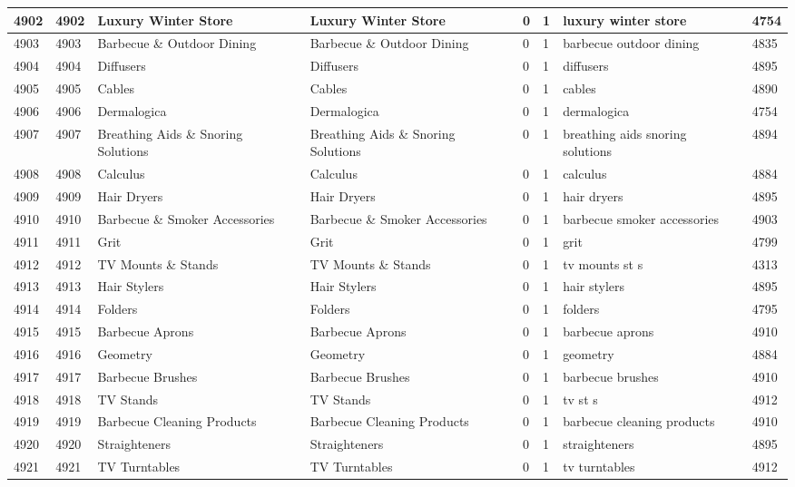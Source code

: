 \begin{longtable}{|l|l|l|l|l|l|l|l|}
4902 & 4902 & Luxury Winter Store & Luxury Winter Store & 0 & 1 & luxury winter store & 4754 \\ \hline 
4903 & 4903 & Barbecue \& Outdoor Dining & Barbecue \& Outdoor Dining & 0 & 1 & barbecue outdoor dining & 4835 \\ \hline 
4904 & 4904 & Diffusers & Diffusers & 0 & 1 & diffusers & 4895 \\ \hline 
4905 & 4905 & Cables & Cables & 0 & 1 & cables & 4890 \\ \hline 
4906 & 4906 & Dermalogica & Dermalogica & 0 & 1 & dermalogica & 4754 \\ \hline 
4907 & 4907 & Breathing Aids \& Snoring Solutions & Breathing Aids \& Snoring Solutions & 0 & 1 & breathing aids snoring solutions & 4894 \\ \hline 
4908 & 4908 & Calculus & Calculus & 0 & 1 & calculus & 4884 \\ \hline 
4909 & 4909 & Hair Dryers & Hair Dryers & 0 & 1 & hair dryers & 4895 \\ \hline 
4910 & 4910 & Barbecue \& Smoker Accessories & Barbecue \& Smoker Accessories & 0 & 1 & barbecue smoker accessories & 4903 \\ \hline 
4911 & 4911 & Grit & Grit & 0 & 1 & grit & 4799 \\ \hline 
4912 & 4912 & TV Mounts \& Stands & TV Mounts \& Stands & 0 & 1 & tv mounts st s & 4313 \\ \hline 
4913 & 4913 & Hair Stylers & Hair Stylers & 0 & 1 & hair stylers & 4895 \\ \hline 
4914 & 4914 & Folders & Folders & 0 & 1 & folders & 4795 \\ \hline 
4915 & 4915 & Barbecue Aprons & Barbecue Aprons & 0 & 1 & barbecue aprons & 4910 \\ \hline 
4916 & 4916 & Geometry & Geometry & 0 & 1 & geometry & 4884 \\ \hline 
4917 & 4917 & Barbecue Brushes & Barbecue Brushes & 0 & 1 & barbecue brushes & 4910 \\ \hline 
4918 & 4918 & TV Stands & TV Stands & 0 & 1 & tv st s & 4912 \\ \hline 
4919 & 4919 & Barbecue Cleaning Products & Barbecue Cleaning Products & 0 & 1 & barbecue cleaning products & 4910 \\ \hline 
4920 & 4920 & Straighteners & Straighteners & 0 & 1 & straighteners & 4895 \\ \hline 
4921 & 4921 & TV Turntables & TV Turntables & 0 & 1 & tv turntables & 4912 \\ \hline 

\end{longtable}

